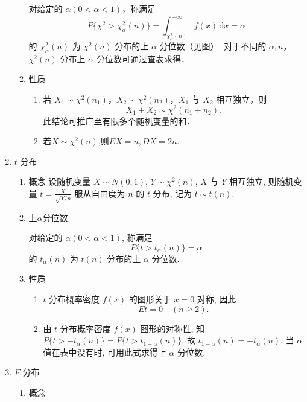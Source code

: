 \begin{enumerate}
\begin{enumerate}
                    对给定的 $\alpha (0 < \alpha < 1)$，称满足
                    $$P\{\chi^{2} > \chi_{\alpha}^{2}(n)\} = \int_{\chi_{\alpha}^{2}(n)}^{+\infty} f(x) \, \mathrm{d}x = \alpha$$
                    的 $\chi_{\alpha}^{2}(n)$ 为 $\chi^{2}(n)$ 分布的上 $\alpha$ 分位数（见图）. 对于不同的 $\alpha, n$，$\chi^{2}(n)$ 分布上 $\alpha$ 分位数可通过查表求得．
              \item 性质
                    \begin{enumerate}
                        \item  若 $X_{1} \sim \chi^{2}(n_{1})$，$X_{2} \sim \chi^{2}(n_{2})$，$X_{1}$ 与 $X_{2}$ 相互独立，则
                              $$
                                  X_{1} + X_{2} \sim \chi^{2}(n_{1} + n_{2}).$$
                              此结论可推广至有限多个随机变量的和．
                        \item $若X\sim\chi^{2}(n)$,则$EX=n,DX=2n.$
                    \end{enumerate}
          \end{enumerate}
    \item $t$ 分布
          \begin{enumerate}
              \item 概念
                    设随机变量 $X \sim N(0,1)$, $Y \sim \chi^2(n)$, $X$ 与 $Y$ 相互独立, 则随机变量 $t = \frac{X}{\sqrt{Y/n}}$ 服从自由度为 $n$ 的 $t$ 分布, 记为 $t \sim t(n)$.
              \item 上$\alpha$分位数

                    对给定的 $\alpha(0 < \alpha < 1)$, 称满足
                    $$P\{t > t_{\alpha}(n)\} = \alpha$$
                    的 $t_{\alpha}(n)$ 为 $t(n)$ 分布的上 $\alpha$ 分位数.
              \item 性质
                    \begin{enumerate}
                        \item  $t$ 分布概率密度 $f(x)$ 的图形关于 $x = 0$ 对称, 因此
                              $$Et = 0 \quad (n \geqslant 2).$$
                        \item 由 $t$ 分布概率密度 $f(x)$ 图形的对称性, 知 $P\{t > -t_{\alpha}(n)\} = P\{t > t_{1-\alpha}(n)\}$, 故 $t_{1-\alpha}(n) = -t_{\alpha}(n)$. 当 $\alpha$ 值在表中没有时, 可用此式求得上 $\alpha$ 分位数.
                    \end{enumerate}
          \end{enumerate}
    \item $F$ 分布
          \begin{enumerate}
              \item 概念


\end{enumerate}
\end{enumerate}
